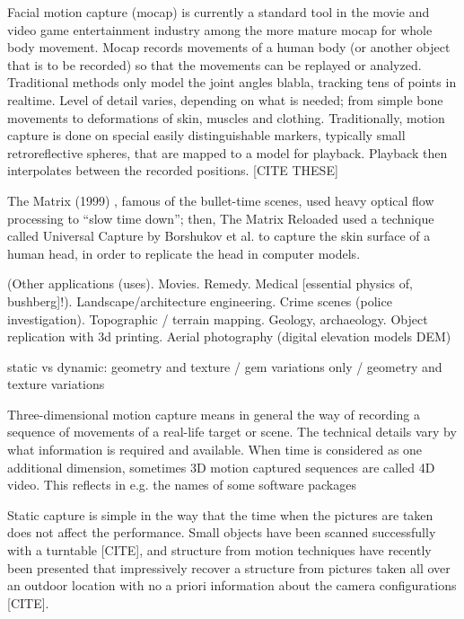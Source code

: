 Facial motion capture (mocap) is currently a standard tool in the movie and video game entertainment industry among the more mature mocap for whole body movement.
Mocap records movements of a human body (or another object that is to be recorded) so that the movements can be replayed or analyzed. Traditional methods only model the joint angles blabla, tracking tens of points in realtime.
Level of detail varies, depending on what is needed; from simple bone movements to deformations of skin, muscles and clothing.
Traditionally, motion capture is done on special easily distinguishable markers, typically small retroreflective spheres, that are mapped to a model for playback. Playback then interpolates between the recorded positions. [CITE THESE]

The Matrix (1999) \cite{wachowski99matrix}, famous of the bullet-time scenes, used heavy optical flow processing to ``slow time down''; then, The Matrix Reloaded \cite{wachowski03reloaded} used a technique called Universal Capture by Borshukov et al. \cite{borshukov05universal} to capture the skin surface of a human head, in order to replicate the head in computer models.

(Other applications (uses). Movies. Remedy. Medical [essential physics of, bushberg]!). Landscape/architecture engineering. Crime scenes (police investigation). Topographic / terrain mapping. Geology, archaeology. Object replication with 3d printing. Aerial photography (digital elevation models DEM)

static vs dynamic: geometry and texture / gem variations only / geometry and texture variations

Three-dimensional motion capture means in general the way of recording a sequence of movements of a real-life target or scene.
The technical details vary by what information is required and available.
When time is considered as one additional dimension, sometimes 3D motion captured sequences are called 4D video.
This reflects in e.g. the names of some software packages \cite{something4dgoogleitup}

Static capture is simple in the way that the time when the pictures are taken does not affect the performance.
Small objects have been scanned successfully with a turntable [CITE], and structure from motion techniques have recently been presented that impressively recover a structure from pictures taken all over an outdoor location with no a priori information about the camera configurations [CITE].

